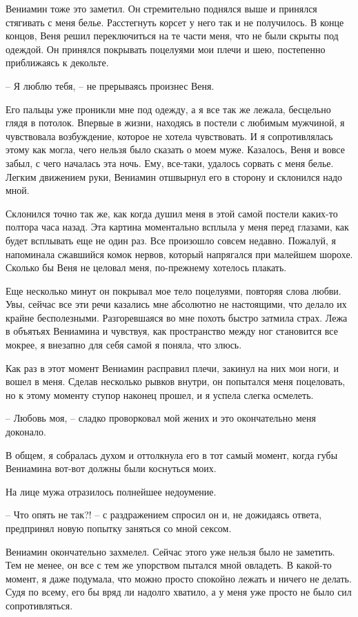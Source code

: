 \documentclass[
]{book}
\begin{document}
Вениамин тоже это заметил. Он стремительно поднялся выше и принялся стягивать с меня белье. Расстегнуть корсет у него так и не получилось. В конце концов, Веня решил переключиться на те части меня, что не были скрыты под одеждой. Он принялся покрывать поцелуями мои плечи и шею, постепенно приближаясь к декольте.

-- Я люблю тебя, -- не прерываясь произнес Веня.

Его пальцы уже проникли мне под одежду, а я все так же лежала, бесцельно глядя в потолок. Впервые в жизни, находясь в постели с любимым мужчиной, я чувствовала возбуждение, которое не хотела чувствовать. И я сопротивлялась этому как могла, чего нельзя было сказать о моем муже. Казалось, Веня и вовсе забыл, с чего началась эта ночь. Ему, все-таки, удалось сорвать с меня белье. Легким движением руки, Вениамин отшвырнул его в сторону и склонился надо мной.

Склонился точно так же, как когда душил меня в этой самой постели каких-то полтора часа назад. Эта картина моментально всплыла у меня перед глазами, как будет всплывать еще не один раз. Все произошло совсем недавно. Пожалуй, я напоминала сжавшийся комок нервов, который напрягался при малейшем шорохе. Сколько бы Веня не целовал меня, по-прежнему хотелось плакать.

Еще несколько минут он покрывал мое тело поцелуями, повторяя слова любви. Увы, сейчас все эти речи казались мне абсолютно не настоящими, что делало их крайне бесполезными. Разгоревшаяся во мне похоть быстро затмила страх. Лежа в объятьях Вениамина и чувствуя, как пространство между ног становится все мокрее, я внезапно для себя самой я поняла, что злюсь.

Как раз в этот момент Вениамин расправил плечи, закинул на них мои ноги, и вошел в меня. Сделав несколько рывков внутри, он попытался меня поцеловать, но к этому моменту ступор наконец прошел, и я успела слегка осмелеть.

-- Любовь моя, -- сладко проворковал мой жених и это окончательно меня доконало.

В общем, я собралась духом и оттолкнула его в тот самый момент, когда губы Вениамина вот-вот должны были коснуться моих.

На лице мужа отразилось полнейшее недоумение.

-- Что опять не так?! -- с раздражением спросил он и, не дожидаясь ответа, предпринял новую попытку заняться со мной сексом.

Вениамин окончательно захмелел. Сейчас этого уже нельзя было не заметить. Тем не менее, он все с тем же упорством пытался мной овладеть. В какой-то момент, я даже подумала, что можно просто спокойно лежать и ничего не делать. Судя по всему, его бы вряд ли надолго хватило, а у меня уже просто не было сил сопротивляться.
\end{document}
